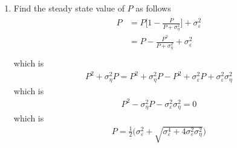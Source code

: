 \documentclass[14pt]{article}
\begin{document}
\begin{enumerate}
	\item Find the steady state value of $P$ as follows
		\begin{eqnarray}
	\begin{aligned}
	P &= P \bigg[ 1  - \frac{P}{P + \sigma^2_{\eta}} \bigg] + \sigma^2_{\varepsilon} \\
	  &= P  - \frac{P^2}{P + \sigma^2_{\eta}}  + \sigma^2_{\varepsilon} \\
	\end{aligned}
	\end{eqnarray}
	which is 
			\begin{eqnarray}
	P^2  + \sigma^2_{\eta}P = P^2 + \sigma^2_{\eta}P  - P^2  + \sigma^2_{\varepsilon} P  + \sigma^2_{\varepsilon} \sigma^2_{\eta}
	\end{eqnarray}
which is 
\begin{eqnarray}
P^2  - \sigma^2_{\eta}P - \sigma^2_{\varepsilon} \sigma^2_{\eta} = 0
\end{eqnarray}
which is
\begin{eqnarray}
P = \frac{1}{2} \bigg(  \sigma^2_{\varepsilon}  +  \sqrt{\sigma^4_{\varepsilon} + 4 \sigma^2_{\varepsilon} \sigma^2_{\eta}}  \bigg)
\end{eqnarray}





\end{enumerate}
\end{document}

